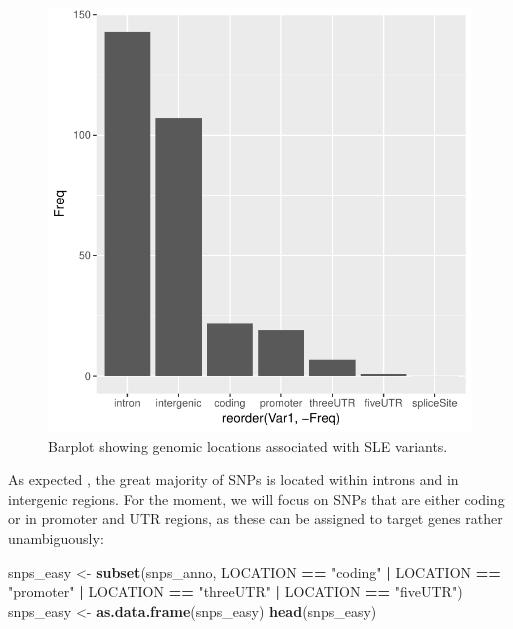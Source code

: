 \documentclass[9pt,a4paper,]{extarticle}
\newenvironment{Shaded}{\begin{snugshade}}{\end{snugshade}}
\newcommand{\KeywordTok}[1]{\textcolor[rgb]{0.13,0.29,0.53}{\textbf{#1}}}
\newcommand{\StringTok}[1]{\textcolor[rgb]{0.31,0.60,0.02}{#1}}
\newcommand{\OperatorTok}[1]{\textcolor[rgb]{0.81,0.36,0.00}{\textbf{#1}}}
\newcommand{\NormalTok}[1]{#1}
\begin{document}
\begin{figure}

{\centering \includegraphics{biocondutor-regulatory-genomics-workflow_files/figure-latex/barplot-1} 

}

\caption{Barplot showing genomic locations associated with SLE variants.}\label{fig:barplot}
\end{figure}

As expected \citep{Maurano2012}, the great majority of SNPs is located within introns and in intergenic regions.
For the moment, we will focus on SNPs that are either coding or in promoter and UTR regions, as these can be assigned to target genes rather unambiguously:

\begin{Shaded}
\begin{Highlighting}[]
\NormalTok{snps_easy <-}\StringTok{ }\KeywordTok{subset}\NormalTok{(snps_anno, LOCATION }\OperatorTok{==}\StringTok{ "coding"} \OperatorTok{|}\StringTok{ }\NormalTok{LOCATION }\OperatorTok{==}\StringTok{ "promoter"} \OperatorTok{|}\StringTok{ }\NormalTok{LOCATION }\OperatorTok{==}\StringTok{ "threeUTR"} \OperatorTok{|}\StringTok{ }\NormalTok{LOCATION }\OperatorTok{==}\StringTok{ "fiveUTR"}\NormalTok{)}
\NormalTok{snps_easy <-}\StringTok{ }\KeywordTok{as.data.frame}\NormalTok{(snps_easy)}
\KeywordTok{head}\NormalTok{(snps_easy)}
\end{Highlighting}
\end{Shaded}
\end{document}
